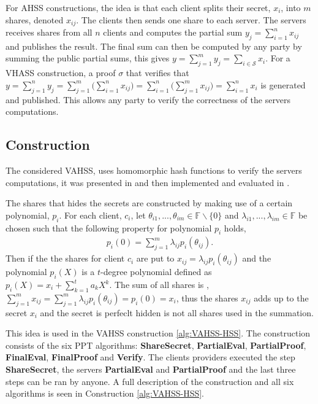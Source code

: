 For AHSS constructions, the idea is that each client splits their secret, $x_i$, into $m$ shares, denoted $x_{ij}$. The clients then sends one share to each server. The servers receives shares from all $n$ clients and computes the partial sum $y_j = \sum_{i=1}^n x_{ij} $ and publishes the result. The final sum can then be computed by any party by summing the public partial sums, this gives $y = \sum_{j=1}^m y_j = \sum_{i\in\mathcal{S}} x_i$. For a VHASS construction, a proof $\sigma$ that verifies that $y= \sum_{j=1}^n y_j= \sum_{j=1}^m \big( \sum_{i=1}^n  x_{ij} \big) =  \sum_{i=1}^n \big( \sum_{j=1}^m  x_{ij} \big)  = \sum_{i=1}^n x_i$ is generated and published. This allows any party to verify the correctness of the servers computations.


\subsection*{Construction}
The considered VAHSS, uses homomorphic hash functions to verify the servers computations, it was presented in \cite{SumItUp} and then implemented and evaluated in \cite{VAHSS}.

The shares that hides the secrets are constructed by making use of a certain polynomial, $p_i$. For each client, $c_i$, let $\theta_{i1},...,\theta_{im}\in\mathds{F}\backslash\{0\}$ and $\lambda_{i1},...,\lambda_{im}\in\mathds{F}$ be chosen such that the following property for polynomial $p_i$ holds,
\begin{align}
\label{eq:pi(0)}
p_i(0) = \sum_{j=1}^m \lambda_{ij}p_i(\theta_{ij}).
\end{align}
Then if the the shares for client $c_i$ are put to $x_{ij}= \lambda_{ij}p_i(\theta_{ij})$ and the polynomial $p_i(X)$ is a $t$-degree polynomial defined as $p_i(X) = x_i + \sum_{k=1}^t a_kX^k$. The sum of all shares is , $\sum_{j=1}^m x_{ij} = \sum_{j=1}^m \lambda_{ij}p_i(\theta_{ij})= p_i(0) = x_i$, thus the shares $x_{ij}$ adds up to the secret $x_i$  and the secret is perfeclt hidden is not all shares used in the summation. 

This idea is used in the VAHSS construction \ref{alg:VAHSS-HSS}. The construction consists of the six PPT algorithms: \textbf{ShareSecret}, \textbf{PartialEval}, \textbf{PartialProof}, \textbf{FinalEval}, \textbf{FinalProof} and \textbf{Verify}. The clients providers executed the step \textbf{ShareSecret}, the servers \textbf{PartialEval} and \textbf{PartialProof} and the last three steps can be ran by anyone. A full description of the construction and all six algorithms is seen in Construction \ref{alg:VAHSS-HSS}.

